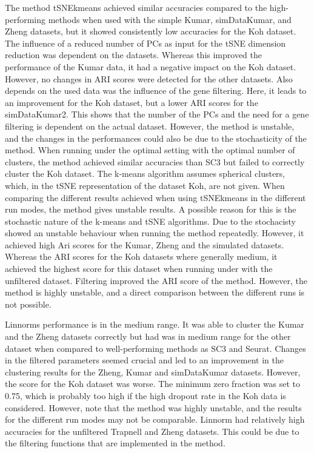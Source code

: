 \documentclass[11pt, a4paper]{article}\usepackage[]{graphicx}\usepackage[]{color}
\begin{document}
The method tSNEkmeans achieved similar accuracies compared to the high-performing methods when used with the simple Kumar, simDataKumar, and Zheng datasets, but it showed consistently low accuracies for the Koh dataset. The influence of a reduced number of PCs as input for the tSNE dimension reduction was dependent on the datasets. Whereas this improved the performance of the Kumar data, it had a negative impact on the Koh dataset. However, no changes in ARI scores were detected for the other datasets. Also depends on the used data was the influence of the gene filtering. Here, it leads to an improvement for the Koh dataset, but a lower ARI scores for the simDataKumar2. 
This shows that the number of the PCs and the need for a gene filtering is dependent on the actual dataset. However, the method is unstable, and the changes in the performances could also be due to the stochasticity of the method.
When running under the optimal setting with the optimal number of clusters, the method achieved similar accuracies than SC3 but failed to correctly cluster the Koh dataset. The k-means algorithm assumes spherical clusters, which, in the tSNE representation of the dataset Koh, are not given. When comparing the different results achieved when using tSNEkmeans in the different run modes, the method gives unstable results. A possible reason for this is the stochastic nature of the k-means and tSNE algorithms. 
Due to the stochacisty showed an unstable behaviour when running the method repeatedly. However, it achieved high Ari scores for the Kumar, Zheng and the simulated datasets. Whereas the ARI scores for the Koh datasets where generally medium, it achieved the highest score for this dataset when running under with the unfiltered dataset. Filtering improved the ARI score of the method. However, the method is highly unstable, and a direct comparison between the different runs is not possible. 


Linnorms performance is in the medium range. It was able to cluster the Kumar and the Zheng datasets correctly but had was in medium range for the other dataset when compared to well-performing methods as SC3 and Seurat. Changes in the filtered parameters seemed crucial and led to an improvement in the clustering results for the Zheng, Kumar and simDataKumar datasets. However, the score for the Koh dataset was worse. The minimum zero fraction was set to 0.75, which is probably too high if the high dropout rate in the Koh data is considered.  However, note that the method was highly unstable, and the results for the different run modes may not be comparable. 
Linnorm had relatively high accuracies for the unfiltered Trapnell and Zheng datasets. This could be due to the filtering functions that are implemented in the method.
\end{document}
